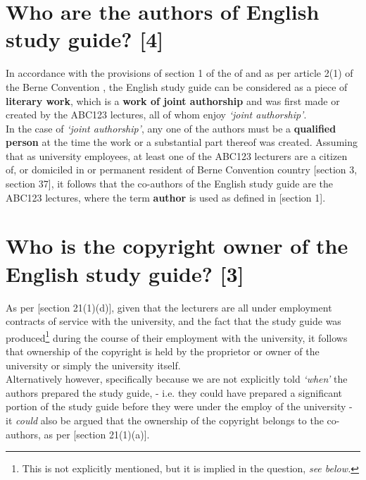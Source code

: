 \documentclass[11pt]{article}
\begin{document}
\section{Who are the authors of English study guide? \textbf{[4]}}
\label{sec:org9763739}

In accordance with the provisions of section 1 of the
 of 
\cite{rsa78_copyrightact} and as per article 2(1) of the Berne
Convention \cite{wipo86_berne}, the English study guide can be
considered as a piece of \textbf{literary work}, which is a \textbf{work of joint
authorship} and was first made or created by the ABC123 lectures, all
of whom enjoy \emph{`joint authorship'}.\\

In the case of \emph{`joint authorship'}, any one of the authors must be a
\textbf{qualified person} at the time the work or a substantial part thereof
was created. Assuming that as university employees, at least one of
the ABC123 lecturers are a citizen of, or domiciled in or permanent
resident of Berne Convention country [section 3, section
37]\cite{wipo86_berne}, it follows that the co-authors of the English
study guide are the ABC123 lectures, where the term \textbf{author} is used
as defined in
[section 1]\cite{rsa78_copyrightact}.

\section{Who is the copyright owner of the English study guide? \textbf{[3]}}
\label{sec:orgfc2dfd1}

As per [section 21(1)(d)]\cite{rsa78_copyrightact}, given that the
lecturers are all under employment contracts of service with the
university, and the fact that the study guide was produced\footnote{This is
not explicitly mentioned, but it is implied in the question, \emph{see
below.}} during the course of their employment with the university, it
follows that ownership of the copyright is held by the proprietor or
owner of the university or simply the university itself.\\

Alternatively however, specifically because we are not explicitly told
\emph{`when'} the authors prepared the study guide, - i.e. they could have
prepared a significant portion of the study guide before they were
under the employ of the university - it \emph{could} also be argued that
the ownership of the copyright belongs to the co-authors, as per
[section 21(1)(a)]\cite{rsa78_copyrightact}.
\end{document}
